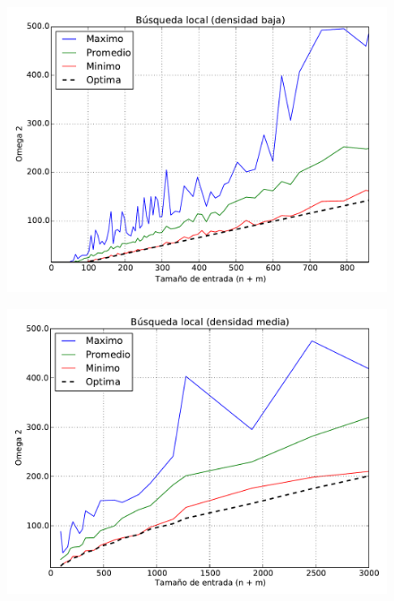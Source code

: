 \begin{figure}[H]
\begin{center}
\includegraphics[angle=0, scale=.70]{imagenes/calidad_local_search_2014-06-27_16-02-57.pdf}
\label{grafico local}
\end{center}
\end{figure}

\begin{figure}[H]
\begin{center}
\includegraphics[angle=0, scale=.70]{imagenes/calidad_local_search_2014-06-27_08-58-52.pdf}
\label{grafico local}
\end{center}
\end{figure}

